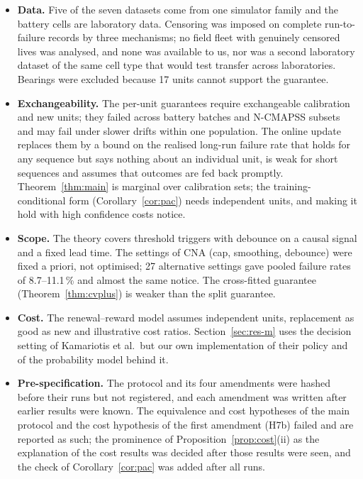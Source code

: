 \begin{itemize}[leftmargin=1.2em,itemsep=2pt]
\item \textbf{Data.} Five of the seven datasets come from one simulator family and the battery cells are laboratory data. Censoring was imposed on complete run-to-failure records by three mechanisms; no field fleet with genuinely censored lives was analysed, and none was available to us, nor was a second laboratory dataset of the same cell type that would test transfer across laboratories. Bearings were excluded because 17 units cannot support the guarantee.
\item \textbf{Exchangeability.} The per-unit guarantees require exchangeable calibration and new units; they failed across battery batches and N-CMAPSS subsets and may fail under slower drifts within one population. The online update replaces them by a bound on the realised long-run failure rate that holds for any sequence but says nothing about an individual unit, is weak for short sequences and assumes that outcomes are fed back promptly. Theorem~\ref{thm:main} is marginal over calibration sets; the training-conditional form (Corollary~\ref{cor:pac}) needs independent units, and making it hold with high confidence costs notice.
\item \textbf{Scope.} The theory covers threshold triggers with debounce on a causal signal and a fixed lead time. The settings of CNA (cap, smoothing, debounce) were fixed a priori, not optimised; 27 alternative settings gave pooled failure rates of 8.7--11.1\,\% and almost the same notice. The cross-fitted guarantee (Theorem~\ref{thm:cvplus}) is weaker than the split guarantee.
\item \textbf{Cost.} The renewal--reward model assumes independent units, replacement as good as new and illustrative cost ratios. Section~\ref{sec:res-m} uses the decision setting of Kamariotis et al.\ but our own implementation of their policy and of the probability model behind it.
\item \textbf{Pre-specification.} The protocol and its four amendments were hashed before their runs but not registered, and each amendment was written after earlier results were known. The equivalence and cost hypotheses of the main protocol and the cost hypothesis of the first amendment (H7b) failed and are reported as such; the prominence of Proposition~\ref{prop:cost}(ii) as the explanation of the cost results was decided after those results were seen, and the check of Corollary~\ref{cor:pac} was added after all runs.
\end{itemize}

